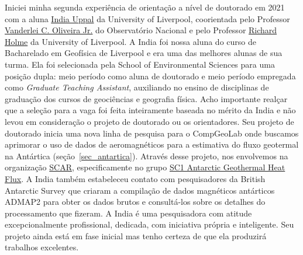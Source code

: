\documentclass[10pt,a4paper,oneside]{book}
\begin{document}
Iniciei minha segunda experiência de orientação a nível de doutorado em 2021
com a aluna \href{https://www.compgeolab.org/team/#indiauppal}{India Uppal} da
University of Liverpool, coorientada pelo Professor
\href{https://www.pinga-lab.org/people/oliveira-jr.html}{Vanderlei C. Oliveira Jr.}
do Observatório Nacional e pelo Professor
\href{https://www.liverpool.ac.uk/~holme/}{Richard Holme} da University of
Liverpool.
A India foi nossa aluna do curso de Bacharelado em Geofísica de Liverpool e era
uma das melhores alunas de sua turma.
Ela foi selecionada pela School of Environmental Sciences para uma posição
dupla: meio período como aluna de doutorado e meio período empregada como
\textit{Graduate Teaching Assistant}, auxiliando no ensino de disciplinas de
graduação dos cursos de geociências e geografia física.
Acho importante realçar que a seleção para a vaga foi feita inteiramente
baseada no mérito da India e não levou em consideração o projeto de doutorado
ou os orientadores.
Seu projeto de doutorado inicia uma nova linha de pesquisa para o CompGeoLab
onde buscamos aprimorar o uso de dados de aeromagnéticos para a estimativa do
fluxo geotermal na Antártica (seção~\ref{sec_antartica}).
Através desse projeto, nos envolvemos na organização
\href{https://www.scar.org/}{SCAR}, especificamente no grupo
\href{https://www.scar-instant.org/index.php/research-themes/theme-2-solid-earth-ice-interactions/sc1-antarctic-geothermal-heat-flux}{SC1 Antarctic Geothermal Heat Flux}.
A India também estabeleceu contato com pesquisadores da British Antarctic
Survey que criaram a compilação de dados magnéticos antárticos ADMAP2
\citep{Golynsky2018} para obter os dados brutos e consultá-los sobre os
detalhes do processamento que fizeram.
A India é uma pesquisadora com atitude excepcionalmente profissional,
dedicada, com iniciativa própria e inteligente.
Seu projeto ainda está em fase inicial mas tenho certeza de que ela produzirá
trabalhos excelentes.
\end{document}
